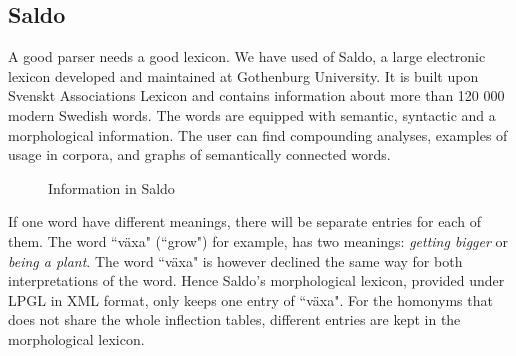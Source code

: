 \documentclass{report}
\begin{document}
\subsection{Saldo}
A good parser needs a good lexicon. We have used of Saldo\cite{saldo}, a
large electronic lexicon developed and maintained at Gothenburg University. It is
built upon Svenskt Associations Lexicon and contains information about more than 
120 000 modern Swedish words.
The words are equipped with semantic, syntactic and a morphological
information. The user can find compounding analyses, examples of usage in corpora,
and graphs of semantically connected words.\\
\newpage %
\begin{figure}[h!]
\centering
{}
\hspace{20mm}
\caption{Information in Saldo}
\label{fig:saldo}
\end{figure}

If one word
have different meanings, there will be separate entries for each of them.
The word ``växa" (``grow") for example, has two meanings: \emph{getting bigger}
or \emph{being a plant}. 
The word ``växa" is however declined the same way for both interpretations of the word.
Hence Saldo's morphological lexicon, provided under LPGL in XML format,
only keeps one entry of ``växa".
For the homonyms that does not share the whole inflection tables, different entries are 
kept in the morphological lexicon.
\end{document}
